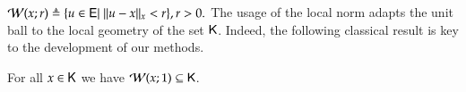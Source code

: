 $\mathcal{W}(x;r)\triangleq\{u\in\mathsf{E}\vert\;\lVert u-x\rVert_{x}<r\}, r>0.$ The usage of the local norm adapts the unit ball to the local geometry of the set $\mathsf{K}$. Indeed, the following classical result is key to the development of our methods. 
\begin{lemma}
\label{lem:Dikin}
For all $x\in\mathsf{K}$ we have $\mathcal{W}(x;1)\subseteq\mathsf{K}$.
\end{lemma}
